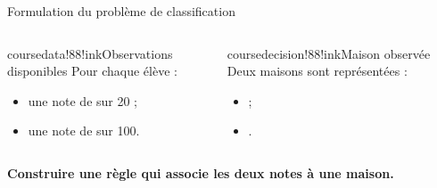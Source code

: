 \newcommand{\microboundary}[1]{%
  \addplot[#1,domain=0:20,samples=2]
    {\MicroBoundarySlope*x+(\MicroBoundaryIntercept)}}
\newcommand{\microboundaryhigh}[1]{%
  \addplot[#1,domain=0:20,samples=2]
    {\MicroBoundarySlope*x+(\MicroBoundaryInterceptHigh)}}

\courseintro

\begin{frame}[t]{Formulation du problème de classification}
  \vspace{4mm}
  \begin{columns}[T,onlytextwidth]
      \begin{coursecallout}{coursedata!88!ink}{Observations disponibles}
        Pour chaque élève :
        \begin{itemize}
          \item une note de \PotionsName{} sur 20 ;
          \item une note de \VolName{} sur 100.
        \end{itemize}
      \end{coursecallout}
      \begin{coursecallout}{coursedecision!88!ink}{Maison observée}
        Deux maisons sont représentées :
        \begin{itemize}
          \item \GryffondorName ;
          \item \SerpentardName.
        \end{itemize}
      \end{coursecallout}
  \end{columns}
  \vfill
  \centering
  {\large\bfseries Construire une règle qui associe les deux notes à une maison.}
\end{frame}

